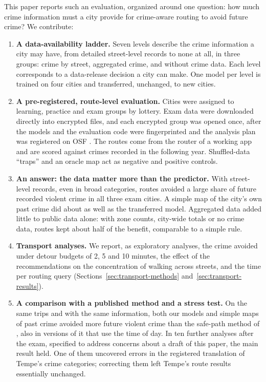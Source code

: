\documentclass[preprint,12pt,authoryear]{elsarticle}
\begin{document}
This paper reports such an evaluation, organized around one question: how much crime information must a city provide for crime-aware routing to avoid future crime? We contribute:
\begin{enumerate}
  \item \textbf{A data-availability ladder.} Seven levels describe the crime information a city may have, from detailed street-level records to none at all, in three groups: crime by street, aggregated crime, and without crime data. Each level corresponds to a data-release decision a city can make. One model per level is trained on four cities and transferred, unchanged, to new cities.
  \item \textbf{A pre-registered, route-level evaluation.} Cities were assigned to learning, practice and exam groups by lottery. Exam data were downloaded directly into encrypted files, and each encrypted group was opened once, after the models and the evaluation code were fingerprinted and the analysis plan was registered on OSF \citep{osf_main,osf_tempe}. The routes come from the router of a working app and are scored against crimes recorded in the following year. Shuffled-data ``traps'' and an oracle map act as negative and positive controls.
  \item \textbf{An answer: the data matter more than the predictor.} With street-level records, even in broad categories, routes avoided a large share of future recorded violent crime in all three exam cities. A simple map of the city's own past crime did about as well as the transferred model. Aggregated data added little to public data alone: with zone counts, city-wide totals or no crime data, routes kept about half of the benefit, comparable to a simple rule.
  \item \textbf{Transport analyses.} We report, as exploratory analyses, the crime avoided under detour budgets of 2, 5 and 10 minutes, the effect of the recommendations on the concentration of walking across streets, and the time per routing query (Sections~\ref{sec:transport-methods} and~\ref{sec:transport-results}).
  \item \textbf{A comparison with a published method and a stress test.} On the same trips and with the same information, both our models and simple maps of past crime avoided more future violent crime than the safe-path method of \citet{galbrun2016safe}, also in versions of it that use the time of day. In ten further analyses after the exam, specified to address concerns about a draft of this paper, the main result held. One of them uncovered errors in the registered translation of Tempe's crime categories; correcting them left Tempe's route results essentially unchanged.
\end{enumerate}
\end{document}
